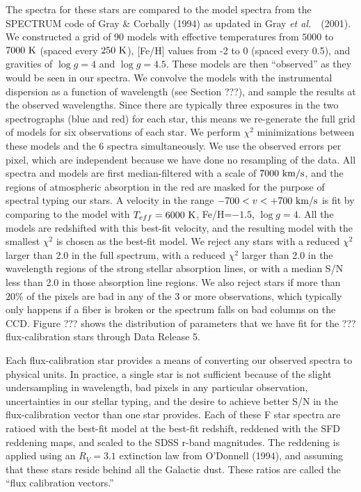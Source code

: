 \documentclass[12pt,preprint]{aastex}
\newcommand{\etal}{{\it et al.}~}
\newcommand{\K}{{\rm ~K}}
\newcommand{\kms}{{\rm ~km/s}}
\begin{document}
The spectra for these stars are compared to the model spectra
from the SPECTRUM code of Gray \& Corbally (1994) as updated
in Gray \etal\ (2001).
We constructed a grid of 90 models with effective temperatures
from $5000$ to $7000 \K$ (spaced every $250 \K$), [Fe/H] values
from -2 to 0 (spaced every 0.5), and gravities of $\log g=4$
and $\log g=4.5$.  These models are then ``observed'' as they
would be seen in our spectra.  We convolve the models with
the instrumental dispersion as a function of wavelength
(see Section ???), and sample the results at the observed wavelengths.
Since there are typically three exposures in the two spectrographs
(blue and red) for each star, this means we re-generate the full
grid of models for six observations of each star.
We perform $\chi^2$ minimizations between these models and the
6 spectra simultaneously.  We use the observed errors per pixel,
which are independent because we have done no resampling of the data.
All spectra and models are first median-filtered with a scale of $7000\kms$,
and the regions of atmospheric absorption in the red are masked
for the purpose of spectral typing our stars.
A velocity in the range $-700 < v < +700 \kms$ is fit
by comparing to the model with $T_{eff} = 6000\K$, Fe/H=$-1.5$,
$\log g=4$.  All the models are redshifted with this best-fit velocity,
and the resulting model with the smallest $\chi^2$ is chosen
as the best-fit model.  We reject any stars with a reduced $\chi^2$
larger than 2.0 in the full spectrum, with a reduced $\chi^2$
larger than 2.0 in the wavelength regions of the strong stellar
absorption lines, or with a median S/N less than 2.0 in
those absorption line regions.
We also reject stars if more than $20\%$ of the pixels are bad
in any of the 3 or more observations, which typically only happens
if a fiber is broken or the spectrum falls on bad columns on the CCD.
Figure ??? shows the distribution of parameters that we have fit
for the ??? flux-calibration stars through Data Release 5.

Each flux-calibration star provides a means of converting our
observed spectra to physical units.  
In practice, a single star is not sufficient because of the
slight undersampling in wavelength, bad pixels in any
particular observation, uncertainties in our stellar typing,
and the desire to achieve better S/N in the flux-calibration
vector than one star provides.  Each of these F star spectra
are ratioed with the best-fit model at the best-fit redshift,
reddened with the SFD reddening maps, and scaled to the SDSS r-band
magnitudes.  The reddening is applied using an $R_V=3.1$ extinction
law from O'Donnell (1994), and assuming that these stars reside
behind all the Galactic dust.
These ratios are called the ``flux calibration vectors.''
\end{document}
